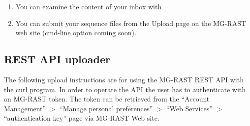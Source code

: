 \documentclass[letterpaper,10pt,english]{sphinxmanual}
\begin{document}
\begin{enumerate}
\item {} 
You can examine the content of your inbox with

\begin{sphinxVerbatim}[commandchars=\\\{\}]
   
\end{sphinxVerbatim}

\item {} 
You can submit your sequence files from the Upload page on the
MG-RAST web site (cmd-line option coming soon).

\end{enumerate}


\subsection{REST API uploader}
\label{\detokenize{faq:rest-api-uploader}}
The following upload instructions are for using the MG-RAST REST API
with the curl program. In order to operate the API the user has to
authenticate with an MG-RAST token. The token can be retrieved from the
“Account Management” \textendash{}\(>\) “Manage personal preferences” \textendash{}\(>\)
“Web Services” \textendash{}\(>\) “authentication key” page via MG-RAST Web
site.
\end{document}
